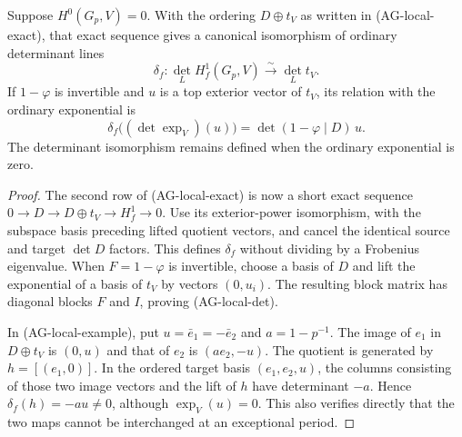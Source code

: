 \begin{proposition}
Suppose $H^0(G_p,V)=0$.  With the ordering $D\oplus t_V$
as written in (AG-local-exact), that exact sequence gives
a canonical isomorphism of ordinary determinant lines
\[
 \delta_f:\det_L H_f^1(G_p,V)\xrightarrow{\sim}\det_L t_V.
\]
If $1-\varphi$ is invertible and $u$ is a top exterior
vector of $t_V$, its relation with the ordinary exponential is
\[
 \delta_f\bigl((\det\exp_V)(u)\bigr)
                      =\det(1-\varphi\mid D)\,u.
\tag{AG-local-det}
\]
The determinant isomorphism remains defined when the ordinary
exponential is zero.
\end{proposition}
\begin{proof}
The second row of (AG-local-exact) is now a short exact
sequence $0\to D\to D\oplus t_V\to H_f^1\to0$.
Use its exterior-power isomorphism, with the subspace basis
preceding lifted quotient vectors, and cancel the identical
source and target $\det D$ factors.  This defines $\delta_f$
without dividing by a Frobenius eigenvalue.  When $F=1-\varphi$
is invertible, choose a basis of $D$ and lift the exponential
of a basis of $t_V$ by vectors $(0,u_i)$.  The resulting
block matrix has diagonal blocks $F$ and $I$, proving
(AG-local-det).

In (AG-local-example), put $u=\bar e_1=-\bar e_2$ and
$a=1-p^{-1}$.  The image of $e_1$ in $D\oplus t_V$ is
$(0,u)$ and that of $e_2$ is $(ae_2,-u)$.
The quotient is generated by $h=[(e_1,0)]$.
In the ordered target basis $(e_1,e_2,u)$, the columns
consisting of those two image vectors and the lift of $h$
have determinant $-a$.  Hence
$\delta_f(h)=-a u\ne0$, although $\exp_V(u)=0$.
This also verifies directly that the two maps cannot be
interchanged at an exceptional period.
\end{proof}

